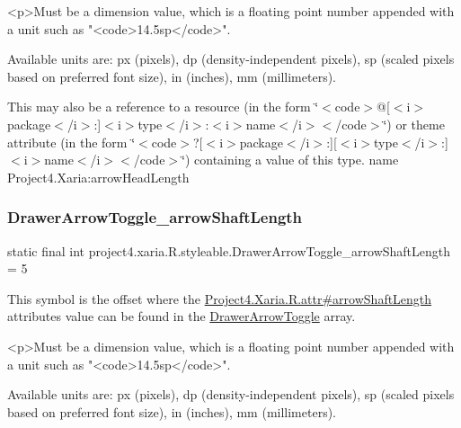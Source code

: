 \begin{DoxyVerb}      <p>Must be a dimension value, which is a floating point number appended with a unit such as "<code>14.5sp</code>".
\end{DoxyVerb}
 Available units are\+: px (pixels), dp (density-\/independent pixels), sp (scaled pixels based on preferred font size), in (inches), mm (millimeters). 

This may also be a reference to a resource (in the form \char`\"{}$<$code$>$@\mbox{[}$<$i$>$package$<$/i$>$\+:\mbox{]}$<$i$>$type$<$/i$>$\+:$<$i$>$name$<$/i$>$$<$/code$>$\char`\"{}) or theme attribute (in the form \char`\"{}$<$code$>$?\mbox{[}$<$i$>$package$<$/i$>$\+:\mbox{]}\mbox{[}$<$i$>$type$<$/i$>$\+:\mbox{]}$<$i$>$name$<$/i$>$$<$/code$>$\char`\"{}) containing a value of this type.  name Project4.\+Xaria\+:arrow\+Head\+Length \mbox{\label{classproject4_1_1xaria_1_1R_1_1styleable_a49fc6620d696930dca13977825e4fc11}} 
\subsubsection{\texorpdfstring{Drawer\+Arrow\+Toggle\+\_\+arrow\+Shaft\+Length}{DrawerArrowToggle\_arrowShaftLength}}
{\footnotesize\ttfamily static final int project4.\+xaria.\+R.\+styleable.\+Drawer\+Arrow\+Toggle\+\_\+arrow\+Shaft\+Length = 5\hspace{0.3cm}{\ttfamily [static]}}

This symbol is the offset where the \hyperlink{}{Project4.\+Xaria.\+R.\+attr\#arrow\+Shaft\+Length} attribute\textquotesingle{}s value can be found in the \hyperlink{classproject4_1_1xaria_1_1R_1_1styleable_aa8594da8de0b2617c3d5cd5e028f8b77}{Drawer\+Arrow\+Toggle} array.

\begin{DoxyVerb}      <p>Must be a dimension value, which is a floating point number appended with a unit such as "<code>14.5sp</code>".
\end{DoxyVerb}
 Available units are\+: px (pixels), dp (density-\/independent pixels), sp (scaled pixels based on preferred font size), in (inches), mm (millimeters). 

